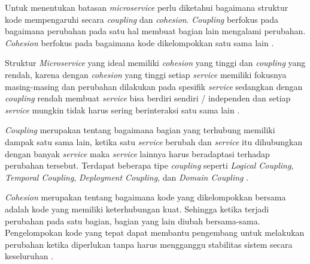 Untuk menentukan batasan \textit{microservice} perlu diketahui bagaimana struktur kode mempengaruhi secara \textit{coupling} dan \textit{cohesion}. \textit{Coupling} berfokus pada bagaimana perubahan pada satu hal membuat bagian lain mengalami perubahan. \textit{Cohesion} berfokus pada bagaimana kode dikelompokkan satu sama lain \cite{74C}. 

Struktur \textit{Microservice} yang ideal memiliki \textit{cohesion} yang tinggi dan \textit{coupling} yang rendah, karena dengan \textit{cohesion} yang tinggi setiap \textit{service} memiliki fokusnya masing-masing dan perubahan dilakukan pada spesifik \textit{service} sedangkan dengan \textit{coupling} rendah membuat \textit{service} bisa berdiri sendiri / independen dan setiap \textit{service} mungkin tidak harus sering berinteraksi satu sama lain \cite{74C}.

\textit{Coupling} merupakan tentang bagaimana bagian yang terhubung memiliki dampak satu sama lain, ketika satu \textit{service} berubah dan \textit{service} itu dihubungkan dengan banyak \textit{service} maka  \textit{service} lainnya harus beradaptasi terhadap perubahan tersebut. Terdapat beberapa tipe \textit{coupling} seperti  \textit{Logical Coupling},  \textit{Temporal Coupling},  \textit{Deployment Coupling}, dan  \textit{Domain Coupling} \cite{74C}.

\textit{Cohesion} merupakan tentang bagaimana kode yang dikelompokkan bersama adalah kode yang memiliki keterhubungan kuat. Sehingga ketika terjadi perubahan pada satu bagian, bagian yang lain diubah bersama-sama. Pengelompokan kode yang tepat dapat membantu pengembang untuk melakukan perubahan ketika diperlukan tanpa harus mengganggu stabilitas sistem secara keseluruhan \cite{74C}.


